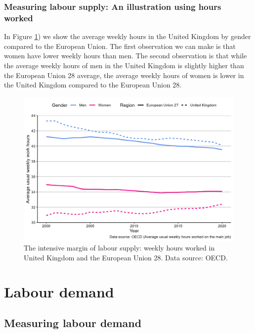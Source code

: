 \documentclass[
]{book}
\begin{document}
\hypertarget{measuring-labour-supply-an-illustration-using-hours-worked}{%
\subsubsection*{Measuring labour supply: An illustration using hours worked}\label{measuring-labour-supply-an-illustration-using-hours-worked}}

In Figure \ref{fig:labour3}) we show the average weekly hours in the United Kingdom by gender compared to the European Union. The first observation we can make is that women have lower weekly hours than men. The second observation is that while the average weekly hours of men in the United Kingdom is slightly higher than the European Union 28 average, the average weekly hours of women is lower in the United Kingdom compared to the European Union 28.

\begin{figure}

{\centering \includegraphics[width=0.89\linewidth]{./resources/chapter_labour/fig17} 

}

\caption{The intensive margin of labour supply: weekly hours worked in United Kingdom and the European Union 28. Data source: OECD. }\label{fig:labour3}
\end{figure}

\hypertarget{labour-demand}{%
\section{Labour demand}\label{labour-demand}}

\hypertarget{measuring-labour-demand}{%
\subsection*{Measuring labour demand}\label{measuring-labour-demand}}
\end{document}
